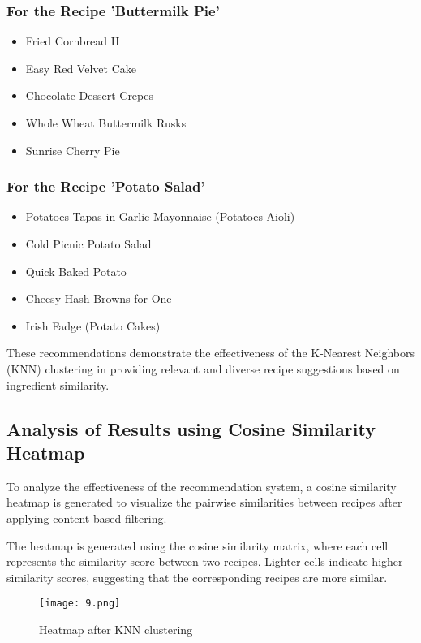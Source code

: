 \documentclass[conference]{IEEEtran}
\begin{document}
\subsubsection{For the Recipe 'Buttermilk Pie'}
\begin{itemize}
    \item Fried Cornbread II
    \item Easy Red Velvet Cake
    \item Chocolate Dessert Crepes
    \item Whole Wheat Buttermilk Rusks
    \item Sunrise Cherry Pie
\end{itemize}

\subsubsection{For the Recipe 'Potato Salad'}
\begin{itemize}
    \item Potatoes Tapas in Garlic Mayonnaise (Potatoes Aioli)
    \item Cold Picnic Potato Salad
    \item Quick Baked Potato
    \item Cheesy Hash Browns for One
    \item Irish Fadge (Potato Cakes)
\end{itemize}

These recommendations demonstrate the effectiveness of the K-Nearest Neighbors (KNN) clustering in providing relevant and diverse recipe suggestions based on ingredient similarity.

\subsection{Analysis of Results using Cosine Similarity Heatmap}

To analyze the effectiveness of the recommendation system, a cosine similarity heatmap is generated to visualize the pairwise similarities between recipes after applying content-based filtering.

The heatmap is generated using the cosine similarity matrix, where each cell represents the similarity score between two recipes. Lighter cells indicate higher similarity scores, suggesting that the corresponding recipes are more similar.

\begin{figure}[H]
\centering
\texttt{[image: 9.png]}
\caption{Heatmap after KNN clustering}
\label{fig:clustering}
\end{figure}
\end{document}
